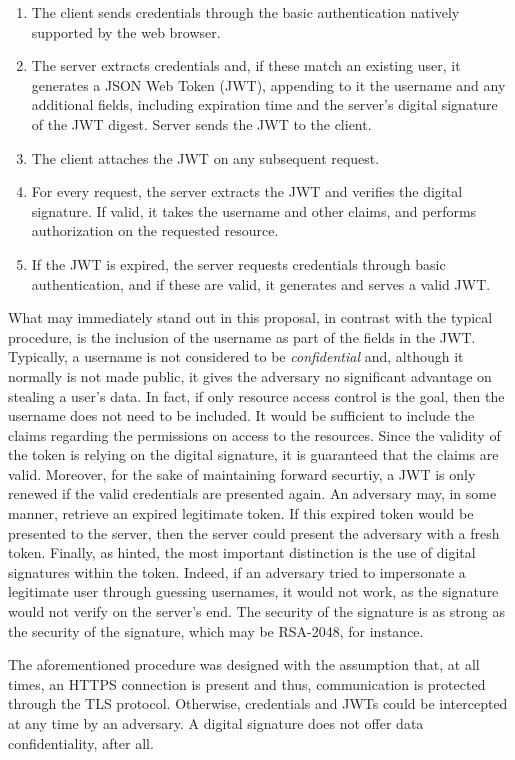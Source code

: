 \documentclass[12pt]{article}
\begin{document}
\begin{enumerate}
\item The client sends credentials through the basic authentication natively supported by the web browser.
\item The server extracts credentials and, if these match an existing user, it generates a JSON Web Token (JWT), appending to it the username and any additional fields, including expiration time and the server's digital signature of the JWT digest. Server sends the JWT to the client.
\item The client attaches the JWT on any subsequent request.
\item For every request, the server extracts the JWT and verifies the digital signature. If valid, it takes the username and other claims, and performs authorization on the requested resource.
\item If the JWT is expired, the server requests credentials through basic authentication, and if these are valid, it generates and serves a valid JWT.
\end{enumerate}

What may immediately stand out in this proposal, in contrast with the typical procedure, is the inclusion of the username as part of the fields in the JWT. Typically, a username is not considered to be \emph{confidential} and, although it normally is not made public, it gives the adversary no significant advantage on stealing a user's data. In fact, if only resource access control is the goal, then the username does not need to be included. It would be sufficient to include the claims regarding the permissions on access to the resources. Since the validity of the token is relying on the digital signature, it is guaranteed that the claims are valid. Moreover, for the sake of maintaining forward securtiy, a JWT is only renewed if the valid credentials are presented again. An adversary may, in some manner, retrieve an expired legitimate token. If this expired token would be presented to the server, then the server could present the adversary with a fresh token. Finally, as hinted, the most important distinction is the use of digital signatures within the token. Indeed, if an adversary tried to impersonate a legitimate user through guessing usernames, it would not work, as the signature would not verify on the server's end. The security of the signature is as strong as the security of the signature, which may be RSA-2048, for instance. 

The aforementioned procedure was designed with the assumption that, at all times, an HTTPS connection is present and thus, communication is protected through the TLS protocol. Otherwise, credentials and JWTs could be intercepted at any time by an adversary. A digital signature does not offer data confidentiality, after all.
\end{document}
